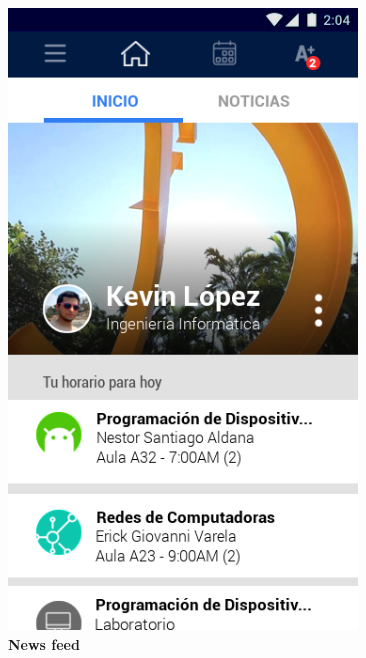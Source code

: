 \documentclass[12pt]{article}
\begin{document}
\begin{figure}[t]
\begin{minipage}[t]{0.45\textwidth}
		\includegraphics[width=0.825\textwidth]{img/2.png}
	\end{minipage}
	\begin{minipage}[t]{0.45\textwidth}
		\centering
		\caption{\textbf{News feed}}
		\label{fig:newsFeed}

\end{minipage}
\end{figure}
\end{document}
